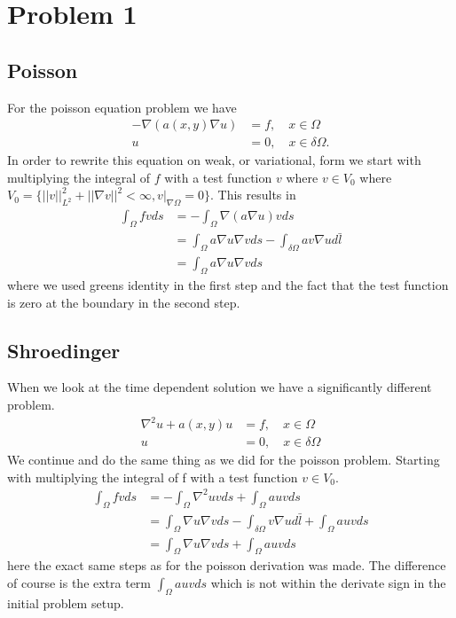 \documentclass[11pt]{article}
\begin{document}
\section{Problem 1}
\subsection{Poisson}
For the poisson equation problem we have
\begin{align}
	-\nabla (a(x,y)\nabla u) &= f,\quad x\in \Omega \\
	u &= 0,\quad x\in \delta \Omega.
\end{align}
In order to rewrite this equation on weak, or variational, form we start with multiplying the integral of $f$ with a test function $v$ where $v\in V_0$ where $V_0 = \{ ||v||^2_{L^2} + ||\nabla v||^2 < \infty, v|_{\nabla \Omega} = 0\}$. This results in
\begin{align}
	\int_{\Omega} f v d s &= - \int_{\Omega} \nabla (a \nabla u) v ds \\
	&= \int_{\Omega} a \nabla u \nabla v ds - \int_{\delta \Omega} a v \nabla u d\bar{l} \\
	&= \int_{\Omega} a \nabla u \nabla v ds
\end{align}
where we used greens identity in the first step and the fact that the test function is zero at the boundary in the second step.
\subsection{Shroedinger}
When we look at the time dependent solution we have a significantly different problem.
\begin{align}
	\nabla^2 u + a(x,y) u &= f, \quad x\in \Omega \\
	u &= 0, \quad x \in \delta \Omega
\end{align}
We continue and do the same thing as we did for the poisson problem. Starting with multiplying the integral of f with a test function $v \in V_0$.
\begin{align}
	\int_{\Omega} f v d s &= - \int_{\Omega} \nabla^2 u v ds + \int_{\Omega} auv ds \\
	&= \int_{\Omega} \nabla u\nabla vds-\int_{\delta\Omega} v \nabla u d\bar{l} + \int_{\Omega} auvds \\
	&= \int_{\Omega} \nabla u \nabla v ds + \int_{\Omega} a u v ds
\end{align}
here the exact same steps as for the poisson derivation was made. The difference of course is the extra term $\int_{\Omega} a u v ds$ which is not within the derivate sign in the initial problem setup.
\end{document}
